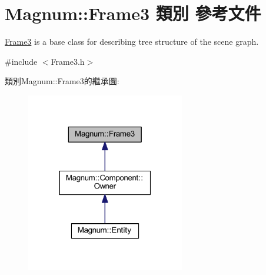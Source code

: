 \hypertarget{class_magnum_1_1_frame3}{}\section{Magnum\+:\+:Frame3 類別 參考文件}
\label{class_magnum_1_1_frame3}


\hyperlink{class_magnum_1_1_frame3}{Frame3} is a base class for describing tree structure of the scene graph.  




{\ttfamily \#include $<$Frame3.\+h$>$}



類別\+Magnum\+:\+:Frame3的繼承圖\+:\nopagebreak
\begin{figure}[H]
\begin{center}
\leavevmode
\includegraphics[width=196pt]{class_magnum_1_1_frame3__inherit__graph}
\end{center}
\end{figure}
